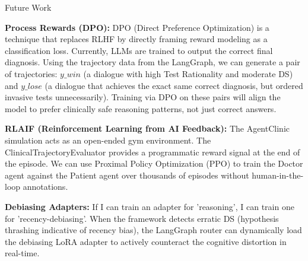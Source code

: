 \begin{frame}{Future Work}
{\textbf{Process Rewards (DPO):} DPO (Direct Preference Optimization) is a technique that replaces RLHF by directly framing reward modeling as a classification loss. Currently, LLMs are trained to output the correct final diagnosis. Using the trajectory data from the LangGraph, we can generate a pair of trajectories: $y\_win$ (a dialogue with high Test Rationality and moderate DS) and $y\_lose$ (a dialogue that achieves the exact same correct diagnosis, but ordered invasive tests unnecessarily). Training via DPO on these pairs will align the model to prefer clinically safe reasoning patterns, not just correct answers.

\textbf{RLAIF (Reinforcement Learning from AI Feedback):} The AgentClinic simulation acts as an open-ended gym environment. The ClinicalTrajectoryEvaluator provides a programmatic reward signal at the end of the episode. We can use Proximal Policy Optimization (PPO) to train the Doctor agent against the Patient agent over thousands of episodes without human-in-the-loop annotations.

\textbf{Debiasing Adapters:} If I can train an adapter for 'reasoning', I can train one for 'recency-debiasing'. When the framework detects erratic DS (hypothesis thrashing indicative of recency bias), the LangGraph router can dynamically load the debiasing LoRA adapter to actively counteract the cognitive distortion in real-time.
}
\end{frame}

